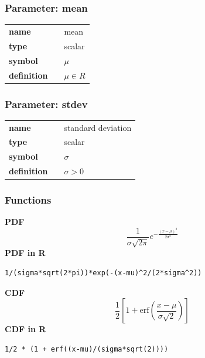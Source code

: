 \subsubsection*{Parameter: mean}

\noindent\begin{tabular}{p{2cm}cl}
\textbf{name} & & mean \\
\textbf{type} & & scalar \\
\textbf{symbol} & & $\mu$  \\
\textbf{definition} & & $\mu \in R$
\end{tabular}
\subsubsection*{Parameter: stdev}

\noindent\begin{tabular}{p{2cm}cl}
\textbf{name} & & standard deviation \\
\textbf{type} & & scalar \\
\textbf{symbol} & & $\sigma$  \\
\textbf{definition} & & $\sigma> 0$
\end{tabular}
\subsubsection*{Functions}

\smallskip \noindent \hspace{.2cm} \textbf{PDF} 
\begin{equation*}\frac{1}{\sigma \sqrt{2 \pi}}e^{-\frac{(x-\mu)^2}{2\sigma^2}}\end{equation*}
\smallskip \noindent \hspace{.2cm} \textbf{PDF in R}  
\begin{verbatim}1/(sigma*sqrt(2*pi))*exp(-(x-mu)^2/(2*sigma^2))\end{verbatim}
\smallskip \noindent \hspace{.2cm} \textbf{CDF} 
\begin{equation*}\frac12\left[1 + \text{erf}\left( \frac{x-\mu}{\sigma\sqrt{2}}\right)\right]\end{equation*}
\smallskip \noindent \hspace{.2cm} \textbf{CDF in R} 
\begin{verbatim}1/2 * (1 + erf((x-mu)/(sigma*sqrt(2))))\end{verbatim}
\smallskip
